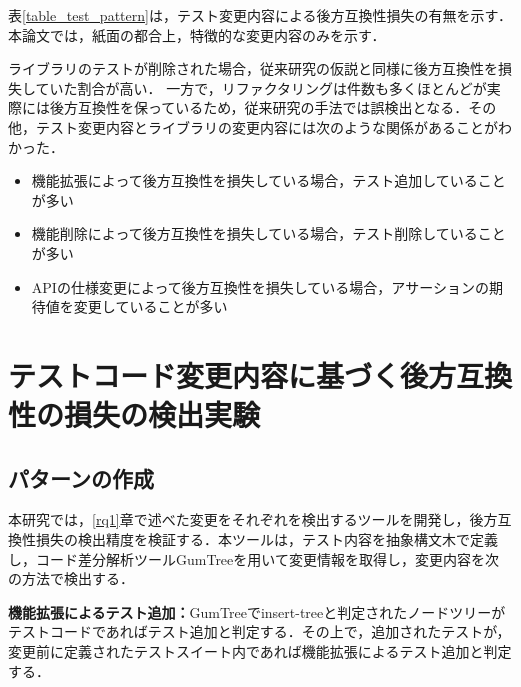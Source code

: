 \documentclass[T,J]{fose} %
\begin{document}
表\ref{table_test_pattern}は，テスト変更内容による後方互換性損失の有無を示す．本論文では，紙面の都合上，特徴的な変更内容のみを示す．

ライブラリのテストが削除された場合，従来研究の仮説と同様に後方互換性を損失していた割合が高い．
一方で，リファクタリングは件数も多くほとんどが実際には後方互換性を保っているため，従来研究の手法では誤検出となる．その他，テスト変更内容とライブラリの変更内容には次のような関係があることがわかった．

\begin{itemize}
    \item 機能拡張によって後方互換性を損失している場合，テスト追加していることが多い
    \item 機能削除によって後方互換性を損失している場合，テスト削除していることが多い
    \item APIの仕様変更によって後方互換性を損失している場合，アサーションの期待値を変更していることが多い
\end{itemize}

\section{テストコード変更内容に基づく後方互換性の損失の検出実験}
\subsection{パターンの作成}\label{create_pattern}
本研究では，\ref{rq1}章で述べた変更をそれぞれを検出するツールを開発し，後方互換性損失の検出精度を検証する．本ツールは，テスト内容を抽象構文木で定義し，コード差分解析ツールGumTree\cite{gumtree}を用いて変更情報を取得し，変更内容を次の方法で検出する．




\noindent\textbf{機能拡張によるテスト追加：}GumTreeでinsert-treeと判定されたノードツリーがテストコードであればテスト追加と判定する．その上で，追加されたテストが，変更前に定義されたテストスイート内であれば機能拡張によるテスト追加と判定する．
\end{document}
